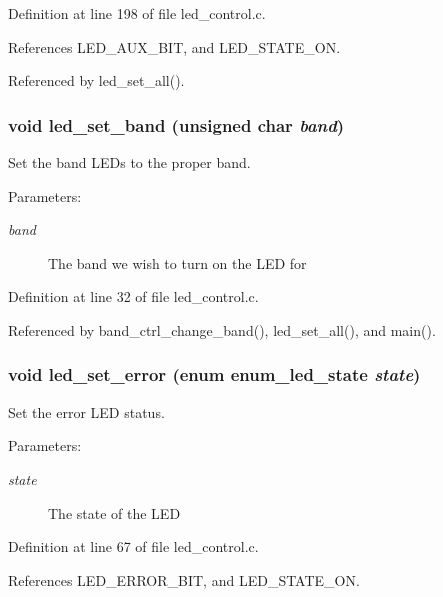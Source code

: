 Definition at line 198 of file led\_\-control.c.

References LED\_\-AUX\_\-BIT, and LED\_\-STATE\_\-ON.

Referenced by led\_\-set\_\-all().
\subsubsection[{led\_\-set\_\-band}]{\setlength{\rightskip}{0pt plus 5cm}void led\_\-set\_\-band (unsigned char {\em band})}\label{led__control_8c_5bfe45c367d2201775bbf65a55ff3634}


Set the band LEDs to the proper band. 

\begin{Desc}
\item[Parameters:]
\begin{description}
\item[{\em band}]The band we wish to turn on the LED for \end{description}
\end{Desc}


Definition at line 32 of file led\_\-control.c.

Referenced by band\_\-ctrl\_\-change\_\-band(), led\_\-set\_\-all(), and main().
\subsubsection[{led\_\-set\_\-error}]{\setlength{\rightskip}{0pt plus 5cm}void led\_\-set\_\-error (enum {\bf enum\_\-led\_\-state} {\em state})}\label{led__control_8c_193a3938c3c5250e16f71f66d60dc5c7}


Set the error LED status. 

\begin{Desc}
\item[Parameters:]
\begin{description}
\item[{\em state}]The state of the LED \end{description}
\end{Desc}


Definition at line 67 of file led\_\-control.c.

References LED\_\-ERROR\_\-BIT, and LED\_\-STATE\_\-ON.


